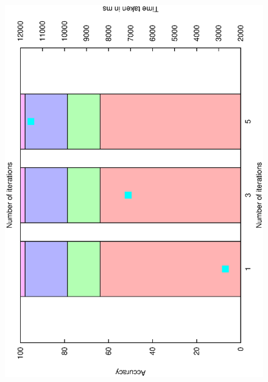 \documentclass[12pt,a4,notitlepage]{report}
\renewcommand{\_}{\texttt{\symbol{95}}}
\newcommand{\<}{\texttt{\symbol{60}}}
\renewcommand{\>}{\texttt{\symbol{62}}}
\begin{document}
\begin{figure}
\includegraphics[scale=0.3,angle=-90]{results/markov/m_iterations.ps}

\end{figure}
\end{document}
